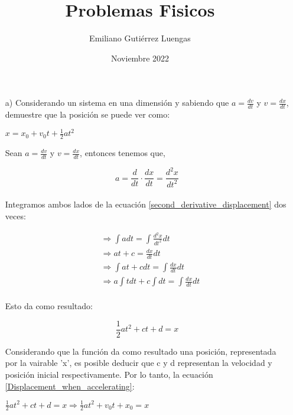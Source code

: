 \documentclass[letterpaper, 12pt]{article}
\title{Problemas Fisicos}
\author{Emiliano Gutiérrez Luengas}
\date{Noviembre 2022}
\begin{document}
\maketitle

\begin{itemize}

    \item [a)]  Considerando un sistema en una dimensi\'on y sabiendo que $a= \frac{dv}{dt}$ y $v= \frac{dx}{dt}$, demuestre que la posici\'on se puede ver como:

\begin{center}
    $x = x_0 + v_0t + \frac{1}{2}at^2$
\end{center}

Sean $a= \frac{dv}{dt}$ y $v= \frac{dx}{dt}$, entonces tenemos que,

\begin{equation}
\label{second_derivative_displacement}
a= \frac{d}{dt} \cdot \frac{dx}{dt} = \frac{d^2x}{dt^2}
\end{equation} \\

Integramos ambos lados de la ecuaci\'on \ref{second_derivative_displacement} dos veces:

\begin{align*}
&\Rightarrow  \int a dt = \int \frac{d^2x}{dt^2} dt \\
&\Rightarrow at + c =\frac{dx}{dt} dt \\
&\Rightarrow  \int at + c dt = \int \frac{dx}{dt} dt \\
&\Rightarrow a \int t dt + c \int dt = \int \frac{dx}{dt} dt \\ 
\end{align*}

Esto da como resultado:

\begin{equation}
\label{Displacement_when_accelerating}
    \frac{1}{2}at^2 + ct + d = x
\end{equation}

Considerando que la funci\'on da como resultado una posici\'on, representada por la vairable 'x', es posible deducir que  c y d representan la velocidad y posici\'on inicial respectivamente. Por lo tanto, la ecuaci\'on \ref{Displacement_when_accelerating}:

\begin{center}
$\frac{1}{2}at^2 + ct + d = x \Rightarrow \frac{1}{2}at^2 + v_0t + x_0 = x$
\end{center}



\end{itemize}
\end{document}
